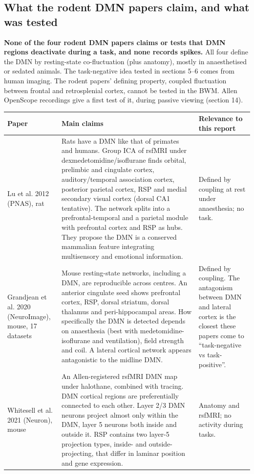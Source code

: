 \documentclass[10pt,a4paper]{article}
\begin{document}
\subsection{What the rodent DMN papers claim, and what was tested}
\textbf{None of the four rodent DMN papers claims or tests that DMN regions deactivate during a task, and none records spikes.} All four define the DMN by resting-state co-fluctuation (plus anatomy), mostly in anaesthetised or sedated animals. The task-negative idea tested in sections 5--6 comes from human imaging. The rodent papers' defining property, coupled fluctuation between frontal and retrosplenial cortex, cannot be tested in the BWM. Allen OpenScope recordings give a first test of it, during passive viewing (section 14).

{\small\renewcommand{\arraystretch}{1.2}
\begin{xltabular}{\linewidth}{>{\hsize\raggedright\arraybackslash}X>{\hsize\raggedright\arraybackslash}X>{\hsize\raggedright\arraybackslash}X}
\toprule
\textbf{Paper} & \textbf{Main claims} & \textbf{Relevance to this report} \\
\midrule
\endhead
Lu et al. 2012 (PNAS), rat & Rats have a DMN like that of primates and humans. Group ICA of rsfMRI under dexmedetomidine/isoflurane finds orbital, prelimbic and cingulate cortex, auditory/temporal association cortex, posterior parietal cortex, RSP and medial secondary visual cortex (dorsal CA1 tentative). The network splits into a prefrontal-temporal and a parietal module with prefrontal cortex and RSP as hubs. They propose the DMN is a conserved mammalian feature integrating multisensory and emotional information. & Defined by coupling at rest under anaesthesia; no task. \\
Grandjean et al. 2020 (NeuroImage), mouse, 17 datasets & Mouse resting-state networks, including a DMN, are reproducible across centres. An anterior cingulate seed shows prefrontal cortex, RSP, dorsal striatum, dorsal thalamus and peri-hippocampal areas. How specifically the DMN is detected depends on anaesthesia (best with medetomidine-isoflurane and ventilation), field strength and coil. A lateral cortical network appears antagonistic to the midline DMN. & Defined by coupling. The antagonism between DMN and lateral cortex is the closest these papers come to ``task-negative vs task-positive''. \\
Whitesell et al. 2021 (Neuron), mouse & An Allen-registered rsfMRI DMN map under halothane, combined with tracing. DMN cortical regions are preferentially connected to each other. Layer 2/3 DMN neurons project almost only within the DMN, layer 5 neurons both inside and outside it. RSP contains two layer-5 projection types, inside- and outside-projecting, that differ in laminar position and gene expression. & Anatomy and rsfMRI; no activity during tasks. \\

\end{xltabular}}
\end{document}
